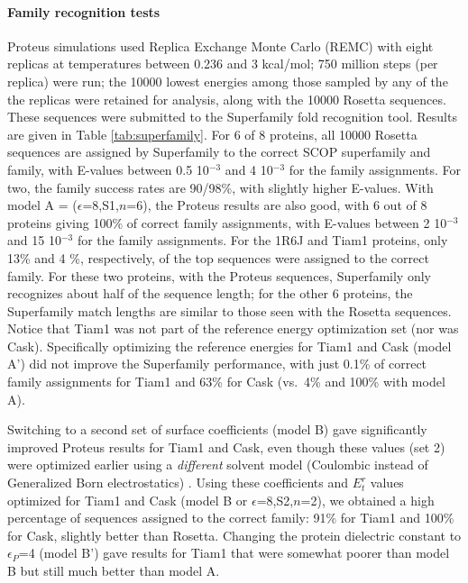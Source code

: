\documentclass[12pt]{article}
\begin{document}
\paragraph{Family recognition tests}
Proteus simulations used Replica Exchange Monte Carlo (REMC) with eight replicas at temperatures between 0.236 and 3 kcal/mol;
750 million steps (per replica) were run; the 10000 lowest energies among those sampled by any of the the replicas were retained
for analysis, along with the 10000 Rosetta sequences. These sequences were submitted to the Superfamily fold recognition tool.
Results are given in Table \ref{tab:superfamily}. For 6 of 8 proteins, all 10000 Rosetta sequences are assigned by Superfamily
to the correct SCOP superfamily and family, with E-values between 0.5 10$^{-3}$ and 4 10$^{-3}$ for the family assignments. For
two, the family success rates are 90/98\%, with slightly higher E-values. With model A = ($\epsilon$=8,S1,$n$=6), the Proteus
results are also good, with 6 out of 8 proteins giving 100\% of correct family assignments, with E-values between 2 10$^{-3}$
and 15 10$^{-3}$ for the family assignments. For the 1R6J and Tiam1 proteins, only 13\% and 4 \%, respectively, of the top sequences
were assigned to the correct family. For these two proteins, with the Proteus sequences, Superfamily only recognizes about half
of the sequence length; for the other 6 proteins, the Superfamily match lengths are similar to those seen with the Rosetta sequences.
Notice that Tiam1 was not part of the reference energy optimization set (nor was Cask). Specifically optimizing the reference
energies for Tiam1 and Cask (model A') did not improve the Superfamily performance, with just 0.1\% of correct family assignments
for Tiam1 and 63\% for Cask (vs.\ 4\% and 100\% with model A). 

Switching to a second set of surface coefficients (model B) gave significantly improved Proteus results for Tiam1 and Cask,
even though these values (set 2) were optimized earlier using a {\it different} solvent model (Coulombic instead of Generalized
Born electrostatics) \cite{Schmidt08b}. Using these coefficients and $E^r_t$ values optimized for Tiam1 and Cask (model B or
$\epsilon$=8,S2,$n$=2), we obtained a high percentage of sequences assigned to the correct family: 91\% for Tiam1 and 100\%
for Cask, slightly better than Rosetta. Changing the protein dielectric constant to $\epsilon_P$=4 (model B') gave results
for Tiam1 that were somewhat poorer than model B but still much better than model A.
\end{document}
